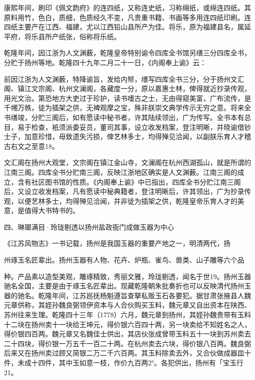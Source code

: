 康熙年间，刷印《佩文韵府》的连四纸，又称连史纸，习称绵纸，或绵连四纸。其原料用竹，色白，质细，色质经久不变，凡贵重书籍、书画等多用连四纸印刷。连四纸主要产在江西、福建，尤以江西铅山县所产为佳。将乐，原为福建县名，属延平府，将乐县所产纸张，俗称将乐纸。

乾隆年间，因江浙为人文渊薮，乾隆皇帝特别谕令四库全书馆另缮三分四库全书，分贮于扬州等地。乾隆四十九年二月二十一日，《内阁奉上谕》云：

\begin{BookQuote}
前因江浙为人文渊薮，特降谕旨，发给内帑，缮写四库全书三分，分于扬州文汇阁、镇江文宗阁、杭州文澜阁，各藏度一分，原以嘉惠士林，俾得就近抄录传观，用光文治。第恐地方大吏过于珍护，读书嗜古之士，无由得窥美富，广布流传，是千缃万帙，徒为插架之供，无裨观摩之宝，殊非朕崇文典学传示无穷之意。将来全书缮竣，分贮三阁后，如有愿读中秘书者，许其陆续领出，广为传写。全书本有总目，易于检查，衹须派委妥员，董司其事，设立收发档案，登注明晰，并晓谕借钞士子，加意珍惜，毋致遗失污损，俾艺林多士，均得殚见洽闻，以副朕乐育人才稽古右文之至意18。
\end{BookQuote}

文汇阁在扬州大观堂，文宗阁在镇江金山寺，文澜阁在杭州西湖孤山，就是所谓的江南三阁。四库全书分贮南三阁，反映江浙地区确实是人文渊薮。江南三阁的成立，含有社区图书馆的性质。《内阁奉上谕》中已指出，四库全书分贮江南三阁后，又设立收发档案，凡有愿读中秘典籍者，登注明晰后，许其领出，广为抄录传观，以便艺林多士，均得殚见洽闻，并非徒为插架之供，乾隆皇帝乐育人才的美意，是值得大书特书的。

四、琳瑯满目·玲珑剔透以扬州盐政衙门成做玉器为中心

\begin{BookQuote}
《江苏风物志》一书记载，扬州是我国玉器的重要产地之一，明清两代，扬
\end{BookQuote}

州琢玉名匠辈出。扬州玉器有人物、花卉、炉瓶、雀鸟、兽类、山子雕等六个品

\vfill
\begin{BookNotes}
\end{BookNotes}

\noindent 种。产品素以造型美观，雕琢精致，秀丽文雅，玲珑剔透，闻名于世19。扬州玉器驰名全国，主要是由于琢玉名匠辈出。现藏乾隆朝朱批奏折也可以反映清代扬州玉器的驰名。乾隆年间，江苏廵抚杨魁遵旨查拏私贩玉石各要犯。据甘肃张掖县人魏元章供称，其姪孙魏良弼领伊资本与人合伙购买玉料，魏元章又自出资本在陕西、苏州往来生理。乾隆四十三年（1778）六月，魏元章到扬州，其姪孙魏贵带有玉料十二块在扬州卖十一块给王坤元，得价银六百四十两，另一块卖给不知姓名之人，得价银四百两。魏元章又名魏佳士供出，其店伙张成曾带玉料五十一块到苏州卖去二十四块，得价银一万五千一百二十两。在杭州卖去六块，得价银八百两。魏良弼后来又在扬州卖过顾又简银二万二千六百两。其玉料除卖去外，又合伙做成器皿十件，未成十四件，其中玉如意一枝，作价九百两2°。各犯供出，扬州有「宝玉行21。

